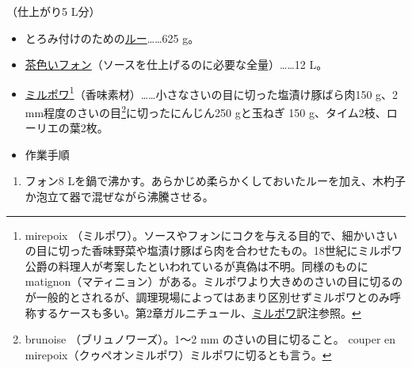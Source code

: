 \begin{recette}

 

（仕上がり5 L分）

\begin{itemize}
\item
  とろみ付けのための\protect\hyperlink{roux-brun}{ルー}\ldots{}\ldots{}625
  g。
\item
  \protect\hyperlink{fonds-brun}{茶色いフォン}（ソースを仕上げるのに必要な全量）\ldots{}\ldots{}12
  L。
\item
  \protect\hyperlink{mirepoix}{ミルポワ}\footnote{mirepoix
    （ミルポワ）。ソースやフォンにコクを与える目的で、細かいさいの目に切った香味野菜や塩漬け豚ばら肉を合わせたもの。18世紀にミルポワ公爵の料理人が考案したといわれているが真偽は不明。同様のものにmatignon（マティニョン）がある。ミルポワより大きめのさいの目に切るのが一般的とされるが、調理現場によってはあまり区別せずミルポワとのみ呼称するケースも多い。第2章ガルニチュール、\protect\hyperlink{mirepoix}{ミルポワ}訳注参照。}（香味素材）\ldots{}\ldots{}小さなさいの目に切った塩漬け豚ばら肉150
  g、2 mm程度のさいの目\footnote{brunoise （ブリュノワーズ）。1〜2 mm
    のさいの目に切ること。 couper en
    mirepoix（クゥペオンミルポワ）ミルポワに切るとも言う。}に切ったにんじん250
  gと玉ねぎ 150
  g、タイム2枝、ローリエの葉2枚。
\item
  作業手順
\end{itemize}

\begin{enumerate}
\def\labelenumi{\arabic{enumi}.}
\item
  フォン8
  Lを鍋で沸かす。あらかじめ柔らかくしておいたルーを加え、木杓子か泡立て器で混ぜながら沸騰させる。


\end{enumerate}
\end{recette}
